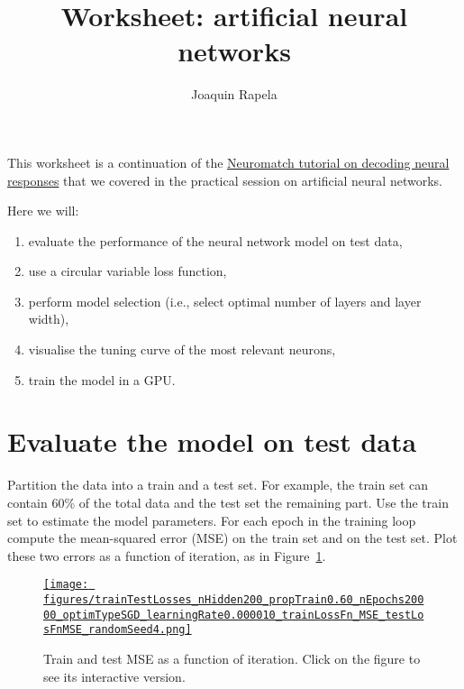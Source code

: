 \documentclass[12pt]{article}
\title{Worksheet: artificial neural networks}
\author{Joaquin Rapela}
\begin{document}
\maketitle

This worksheet is a continuation of the
\href{https://compneuro.neuromatch.io/tutorials/W1D5_DeepLearning/student/W1D5_Tutorial1.html}{Neuromatch
tutorial on decoding neural responses} that we covered in the practical session
on artificial neural networks.

Here we will:

\begin{enumerate}

    \item evaluate the performance of the neural network model on test
        data,

    \item use a circular variable loss function,

    \item perform model selection (i.e., select optimal number of layers and
        layer width),

    \item visualise the tuning curve of the most relevant neurons,

    \item train the model in a GPU.

\end{enumerate}

\section{Evaluate the model on test data}

Partition the data into a train and a test set. For example, the train set can
contain 60\% of the total data and the test set the remaining part. Use the
train set to estimate the model parameters. For each epoch in the training loop
compute the mean-squared error (MSE) on the train set and on the test set.
Plot these two errors as a function of iteration, as in
Figure~\ref{fig:trainMSETestMSE}.

\begin{figure}[H]
    \begin{center}
        \href{https://www.gatsby.ucl.ac.uk/~rapela/statNeuro/2025/worksheets/08_artificialNeuralNetworks/figures/trainTestLosses_nHidden200_propTrain0.60_nEpochs20000_optimTypeSGD_learningRate0.000010_trainLossFn_MSE_testLosFnMSE_randomSeed4.html}{\texttt{[image: figures/trainTestLosses\_nHidden200\_propTrain0.60\_nEpochs20000\_optimTypeSGD\_learningRate0.000010\_trainLossFn\_MSE\_testLosFnMSE\_randomSeed4.png]}}

        \caption{Train and test MSE as a function of iteration. Click on
        the figure to see its interactive version.}

        \label{fig:trainMSETestMSE}
    \end{center}
\end{figure}
\end{document}
